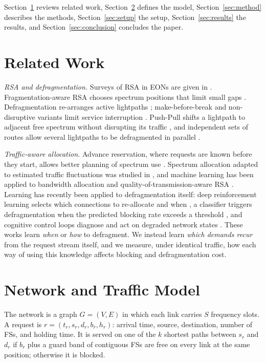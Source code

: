 \documentclass[conference]{IEEEtran}
\begin{document}
Section~\ref{sec:related} reviews related work, Section~\ref{sec:model} defines the model, Section~\ref{sec:method} describes the methods, Section~\ref{sec:setup} the setup, Section~\ref{sec:results} the results, and Section~\ref{sec:conclusion} concludes the paper.

\section{Related Work}\label{sec:related}
\textit{RSA and defragmentation.} Surveys of RSA in EONs are given in \cite{chatterjee2015,abkenar2017}. Fragmentation-aware RSA chooses spectrum positions that limit small gaps \cite{shen2015,athari2019}. Defragmentation re-arranges active lightpaths \cite{patel2011}; make-before-break and non-disruptive variants limit service interruption \cite{wang2013,zhang2013}. Push-Pull shifts a lightpath to adjacent free spectrum without disrupting its traffic \cite{cugini2013}, and independent sets of routes allow several lightpaths to be defragmented in parallel \cite{shakya2013}.

\textit{Traffic-aware allocation.} Advance reservation, where requests are known before they start, allows better planning of spectrum use \cite{lu2013ar}. Spectrum allocation adapted to estimated traffic fluctuations was studied in \cite{chino2016}, and machine learning has been applied to bandwidth allocation \cite{panayiotou2019} and quality-of-transmission-aware RSA \cite{salani2019}. Learning has recently been applied to defragmentation itself: deep reinforcement learning selects which connections to re-allocate and when \cite{etezadi2022,etezadi2023}, a classifier triggers defragmentation when the predicted blocking rate exceeds a threshold \cite{davalos2023}, and cognitive control loops diagnose and act on degraded network states \cite{trindade2021}. These works learn \emph{when} or \emph{how} to defragment. We instead learn \emph{which demands recur} from the request stream itself, and we measure, under identical traffic, how each way of using this knowledge affects blocking and defragmentation cost.

\section{Network and Traffic Model}\label{sec:model}
The network is a graph $G=(V,E)$ in which each link carries $S$ frequency slots. A request is $r=(t_r, s_r, d_r, b_r, h_r)$: arrival time, source, destination, number of FSs, and holding time. It is served on one of the $k$ shortest paths between $s_r$ and $d_r$ if $b_r$ plus a guard band of contiguous FSs are free on every link at the same position; otherwise it is blocked.
\end{document}
